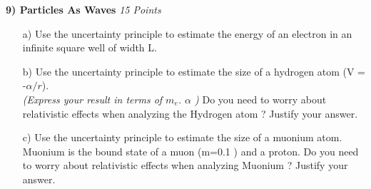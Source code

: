 {\clearpage


\textbf{9) Particles As Waves } \hfill \textit{15 Points}
\begin{itemize}
\item[a)] Use the uncertainty principle to estimate the energy of an electron in an infinite square well of width L.
\vspace*{2.5in}
\item[b)] Use the uncertainty principle to estimate the size of a hydrogen atom (V = -$\alpha/r$). \\ \textit{(Express your result in terms of $m_e$. $\alpha$ )}
          Do you need to worry about relativistic effects when analyzing the Hydrogen atom ?  Justify your answer.
\vspace*{2.5in}
\item[c)] Use the uncertainty principle to estimate the size of a muonium atom. Muonium is the bound state of a muon (m=0.1 \GeV) and a proton.
          Do you need to worry about relativistic effects when analyzing Muonium  ?  Justify your answer. 
\end{itemize}



} %

